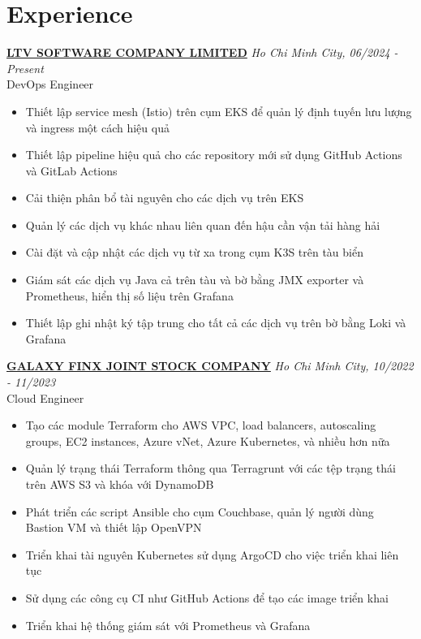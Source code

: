 \documentclass[a4paper,10pt]{article}
\begin{document}
\section*{Experience}
\noindent \textbf{\href{https://www.linkedin.com/company/ltvofficial/posts/?feedView=all}{LTV SOFTWARE COMPANY LIMITED}} \hfill \textit{Ho Chi Minh City, 06/2024 - Present}  \\
DevOps Engineer \\
\begin{itemize}
    \item Thiết lập service mesh (Istio) trên cụm EKS để quản lý định tuyến lưu lượng và ingress một cách hiệu quả
    \item Thiết lập pipeline hiệu quả cho các repository mới sử dụng GitHub Actions và GitLab Actions
    \item Cải thiện phân bổ tài nguyên cho các dịch vụ trên EKS
    \item Quản lý các dịch vụ khác nhau liên quan đến hậu cần vận tải hàng hải
    \item Cài đặt và cập nhật các dịch vụ từ xa trong cụm K3S trên tàu biển
    \item Giám sát các dịch vụ Java cả trên tàu và bờ bằng JMX exporter và Prometheus, hiển thị số liệu trên Grafana
    \item Thiết lập ghi nhật ký tập trung cho tất cả các dịch vụ trên bờ bằng Loki và Grafana
\end{itemize}

\vspace{10pt}
\noindent \textbf{\href{https://www.linkedin.com/company/galaxy-finx/posts/?feedView=all}{GALAXY FINX JOINT STOCK COMPANY}} \hfill \textit{Ho Chi Minh City, 10/2022 - 11/2023} \\
Cloud Engineer \\
\begin{itemize}
    \item Tạo các module Terraform cho AWS VPC, load balancers, autoscaling groups, EC2 instances, Azure vNet, Azure Kubernetes, và nhiều hơn nữa
    \item Quản lý trạng thái Terraform thông qua Terragrunt với các tệp trạng thái trên AWS S3 và khóa với DynamoDB
    \item Phát triển các script Ansible cho cụm Couchbase, quản lý người dùng Bastion VM và thiết lập OpenVPN
    \item Triển khai tài nguyên Kubernetes sử dụng ArgoCD cho việc triển khai liên tục
    \item Sử dụng các công cụ CI như GitHub Actions để tạo các image triển khai
    \item Triển khai hệ thống giám sát với Prometheus và Grafana
\end{itemize}
\end{document}
